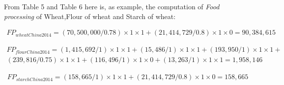 \documentclass[]{article}
\begin{document}
From Table 5 and Table 6 here is, as example, the computation of
\emph{Food processing} of Wheat,Flour of wheat and Starch of wheat:

\begin{equation}
\begin{multlined}
\label{eq:wheatFP}
FP_{wheatChina2014} = \left(70,500,000/0.78\right)\times 1\times 1 +\left(21,414,729/0.8\right)\times 1\times 0 = 90,384,615
\end{multlined}
\end{equation}

\begin{equation}
\begin{multlined}
\label{eq:flourFP}
FP_{flourChina2014} = \left(1,415,692/1\right)\times 1\times 1 +\left(15,486/1\right)\times 1\times 1 
+\left(193,950/1\right)\times 1\times 1
+\\
\left(239,816/0.75\right)\times 1\times 1 +
\left(116,496/1\right)\times 1\times 0 +\left(13,263/1\right)\times 1\times 1= 1,958,146
\end{multlined}
\end{equation}

\begin{equation}
\begin{multlined}
\label{eq:starchFP}
FP_{starchChina2014} = \left(158,665/1\right)\times 1\times 1 +\left(21,414,729/0.8\right)\times 1\times 0 = 158,665
\end{multlined}
\end{equation}
\end{document}
